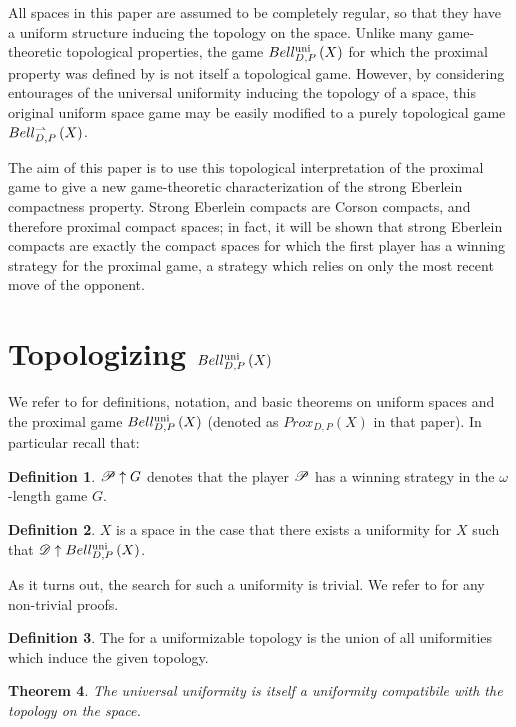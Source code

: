 \documentclass{amsart}
\newtheorem{thm}{Theorem}[section]
\theoremstyle{definition}
\newtheorem{defn}[thm]{Definition}
\begin{document}
All spaces in this paper are assumed to be completely regular, so that they
have a uniform structure inducing the topology on the space.
Unlike many game-theoretic topological properties, the game $Bell_{D,P}^{\textrm{uni}}\left({X}\right)$
for which the proximal property was defined by is not itself a topological game.
However, by considering entourages of the universal uniformity inducing the
topology of a space, this original uniform space game may be easily modified to
a purely topological game $Bell_{D,P}^{\rightharpoonup}\left({X}\right)$.

The aim of this paper is to use this topological interpretation of the
proximal game to give a new game-theoretic characterization of the
strong Eberlein compactness property. Strong Eberlein compacts are Corson
compacts, and therefore proximal compact spaces; in fact, it will be shown that
strong Eberlein compacts are exactly the compact spaces for which the
first player has a  winning strategy for the proximal game,
a strategy which relies on only the most recent move of the opponent.


\section{Topologizing $Bell_{D,P}^{\textrm{uni}}\left({X}\right)$}

We refer to \cite{MR3227201} for definitions, notation, and basic theorems on
uniform spaces and the proximal game $Bell_{D,P}^{\textrm{uni}}\left({X}\right)$ (denoted as
$Prox_{D,P}(X)$ in that paper). In particular recall that:

\begin{defn}
  $\mathscr{P} \uparrow G$ denotes that the player $\mathscr{P}$ has a winning strategy
  in the $\omega$-length game $G$.
\end{defn}

\begin{defn}
  $X$ is a  space in the case that there exists a uniformity
  for $X$ such that $\mathscr{D}\uparrow Bell_{D,P}^{\textrm{uni}}\left({X}\right)$.
\end{defn}

As it turns out, the search for such a uniformity is trivial. We refer to
\cite{MR2048350} for any non-trivial proofs.

\begin{defn}
  The  for a uniformizable topology is the
  union of all uniformities which induce the given topology.
\end{defn}

\begin{thm}
  The universal uniformity is itself a uniformity compatibile with
  the topology on the space.
\end{thm}
\end{document}
